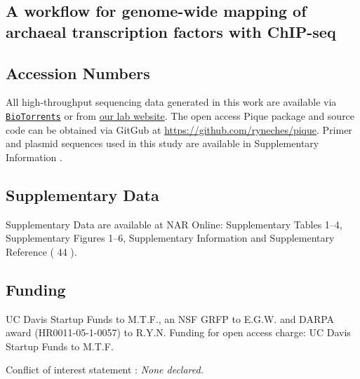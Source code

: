 \begin{refsection}

\chapter{A workflow for genome-wide mapping of archaeal transcription factors with ChIP-seq }








\section{Accession Numbers}

All high-throughput sequencing data generated in this work are available via \href{http://www.biotorrents.net/details.php?id=259}{\tt BioTorrents} or from \href{http://www.bme.ucdavis.edu/facciotti/resources_data/data/}{our lab website}. The open access Pique package and source code can be obtained via GitGub at \url{https://github.com/ryneches/pique}. Primer and plasmid sequences used in this study are available in Supplementary Information .

\section{Supplementary Data}

Supplementary Data are available at NAR Online: Supplementary Tables 1–4, Supplementary Figures 1–6, Supplementary Information and Supplementary Reference ( 44 ).

\section{Funding}

UC Davis Startup Funds to M.T.F., an NSF GRFP to E.G.W. and DARPA award (HR0011-05-1-0057) to R.Y.N. Funding for open access charge: UC Davis Startup Funds to M.T.F.

Conflict of interest statement : {\em None declared.}

\printbibliography[heading=subbibliography]

\end{refsection}